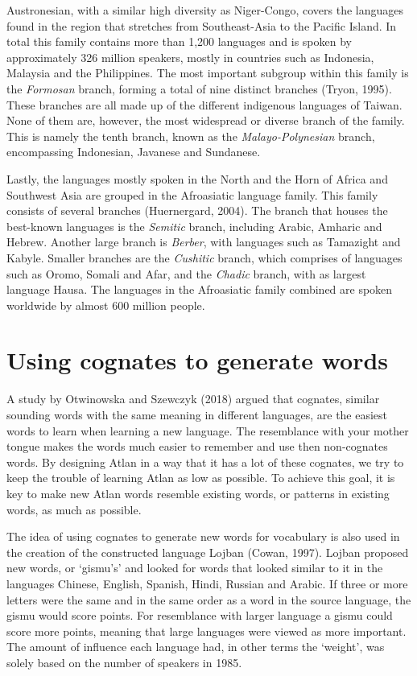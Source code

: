 Austronesian, with a similar high diversity as Niger-Congo, covers the languages found in the region that stretches from Southeast-Asia to the Pacific Island. In total this family contains more than 1,200 languages and is spoken by approximately 326 million speakers, mostly in countries such as Indonesia, Malaysia and the Philippines. The most important subgroup within this family is the \textit{Formosan} branch, forming a total of nine distinct branches (Tryon, 1995). These branches are all made up of the different indigenous languages of Taiwan. None of them are, however, the most widespread or diverse branch of the family. This is namely the tenth branch, known as the \textit{Malayo-Polynesian} branch, encompassing Indonesian, Javanese and Sundanese.  

Lastly, the languages mostly spoken in the North and the Horn of Africa and Southwest Asia are grouped in the Afroasiatic language family.  This family consists of several branches (Huernergard, 2004). The branch that houses the best-known languages is the \textit{Semitic} branch, including Arabic, Amharic and Hebrew. Another large branch is \textit{Berber}, with languages such as Tamazight and Kabyle. Smaller branches are the \textit{Cushitic} branch, which comprises of languages such as Oromo, Somali and Afar, and the \textit{Chadic} branch, with as largest language Hausa. The languages in the Afroasiatic family combined are spoken worldwide by almost 600 million people. 


\section{Using cognates to generate words}


A study by Otwinowska and Szewczyk (2018) argued that cognates, similar sounding words with the same meaning in different languages, are the easiest words to learn when learning a new language. The resemblance with your mother tongue makes the words much easier to remember and use then non-cognates words. By designing Atlan in a way that it has a lot of these cognates, we try to keep the trouble of learning Atlan as low as possible. To achieve this goal, it is key to make new Atlan words resemble existing words, or patterns in existing words, as much as possible. 

The idea of using cognates to generate new words for vocabulary is also used in the creation of the constructed language Lojban (Cowan, 1997).  Lojban proposed new words, or ‘gismu’s’ and looked for words that looked similar to it in the languages Chinese, English, Spanish, Hindi, Russian and Arabic. If three or more letters were the same and in the same order as a word in the source language, the gismu would score points. For resemblance with larger language a gismu could score more points, meaning that large languages were viewed as more important. The amount of influence each language had, in other terms the ‘weight’, was solely based on the number of speakers in 1985.  


